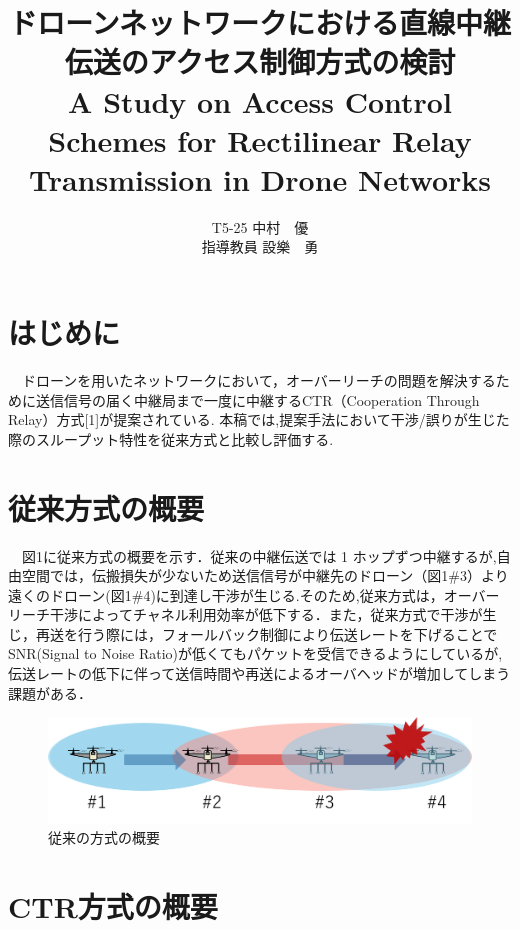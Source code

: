 \documentclass[a4paper,10pt]{ltjsarticle}
\title{\huge ドローンネットワークにおける直線中継伝送のアクセス制御方式の検討\\
\Large A Study on Access Control Schemes for Rectilinear Relay Transmission in Drone Networks
}
\author{
T5-25 \:中村　優\\
指導教員 \: 設樂　勇
}
\date{}
\begin{document}
\twocolumn[
\maketitle
]

\section{はじめに}
　ドローンを用いたネットワークにおいて，オーバーリーチの問題を解決するために送信信号の届く中継局まで一度に中継するCTR（Cooperation Through Relay）方式[1]が提案されている. 本稿では,提案手法において干渉/誤りが生じた際のスループット特性を従来方式と比較し評価する.
\section{従来方式の概要}
　図1に従来方式の概要を示す．従来の中継伝送では 1 ホップずつ中継するが,自由空間では，伝搬損失が少ないため送信信号が中継先のドローン（図1\#3）より遠くのドローン(図1\#4)に到達し干渉が生じる.そのため,従来方式は，オーバーリーチ干渉によってチャネル利用効率が低下する．また，従来方式で干渉が生じ，再送を行う際には，フォールバック制御により伝送レートを下げることでSNR(Signal to Noise Ratio)が低くてもパケットを受信できるようにしているが,伝送レートの低下に伴って送信時間や再送によるオーバヘッドが増加してしまう課題がある．

\begin{figure}[H]
  \centering
  \includegraphics[width=\linewidth]{cenventional_topology.png} %
  \caption{従来の方式の概要}
  \label{fig:従来の方式のトポロジー} %
\end{figure}

\section{CTR方式の概要}
\end{document}
